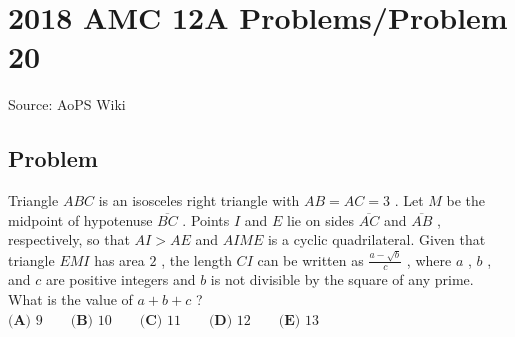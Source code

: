\documentclass[12pt]{article}
\begin{document}
\section*{{2018 AMC 12A Problems/Problem 20}}
Source: AoPS Wiki

\subsection*{Problem}
Triangle $ABC$ is an isosceles right triangle with $AB=AC=3$ . Let $M$ be the midpoint of hypotenuse $\overline{BC}$ . Points $I$ and $E$ lie on sides $\overline{AC}$ and $\overline{AB}$ , respectively, so that $AI>AE$ and $AIME$ is a cyclic quadrilateral. Given that triangle $EMI$ has area $2$ , the length $CI$ can be written as $\frac{a-\sqrt{b}}{c}$ , where $a$ , $b$ , and $c$ are positive integers and $b$ is not divisible by the square of any prime. What is the value of $a+b+c$ ? $\textbf{(A) }9 \qquad \textbf{(B) }10 \qquad \textbf{(C) }11 \qquad \textbf{(D) }12 \qquad \textbf{(E) }13 \qquad$
\end{document}
